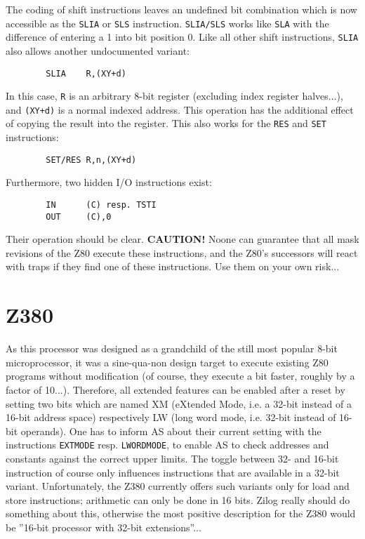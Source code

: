 \documentclass[12pt,twoside]{report}
\newcommand{\bb}[1]{{\bf #1}}
\newcommand{\tty}[1]{{\tt #1}}
\begin{document}
The coding of shift instructions leaves an undefined bit combination which
is now accessible as the \tty{SLIA} or \tty{SLS} instruction.  \tty{SLIA/SLS}
works like \tty{SLA} with the difference of entering a 1 into bit position 0.
Like all other shift instructions, \tty{SLIA} also allows another undocumented
variant:
\begin{verbatim}
        SLIA    R,(XY+d)
\end{verbatim}
In this case, \tty{R} is an arbitrary 8-bit register (excluding index
register halves...), and \tty{(XY+d)} is a normal indexed address.  This
operation has the additional effect of copying the result into the
register.  This also works for the \tty{RES} and \tty{SET} instructions:
\begin{verbatim}
        SET/RES R,n,(XY+d)
\end{verbatim}
Furthermore, two hidden I/O instructions exist:
\begin{verbatim}
        IN      (C) resp. TSTI
        OUT     (C),0
\end{verbatim}
Their operation should be clear.  \bb{CAUTION!}  Noone can
guarantee that all mask revisions of the Z80 execute these
instructions, and the Z80's successors will react with traps if they
find one of these instructions.  Use them on your own risk...


\section{Z380}

As this processor was designed as a grandchild of the still most popular
8-bit microprocessor, it was a sine-qua-non design target to execute
existing Z80 programs without modification (of course, they execute a bit
faster, roughly by a factor of 10...).  Therefore, all extended features
can be enabled after a reset by setting two bits which are named XM
(eXtended Mode, i.e. a 32-bit instead of a 16-bit address space)
respectively LW (long word mode, i.e. 32-bit instead of 16-bit operands).
One has to inform AS about their current setting with the instructions
\tty{EXTMODE} resp. \tty{LWORDMODE}, to enable AS to check addresses and
constants against the correct upper limits.  The toggle between 32- and
16-bit instruction of course only influences instructions that are
available in a 32-bit variant.  Unfortunately, the Z380 currently offers
such variants only for load and store instructions; arithmetic can only be
done in 16 bits.  Zilog really should do something about this, otherwise
the most positive description for the Z380 would be ''16-bit processor
with 32-bit extensions''...
\end{document}
